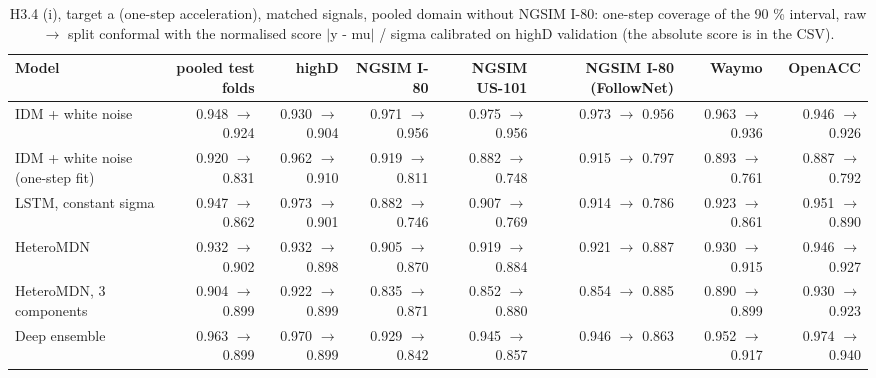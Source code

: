 \begin{table}[htbp]
\centering
\footnotesize
\caption{H3.4 (i), target a (one-step acceleration), matched signals, pooled domain without NGSIM I-80: one-step coverage of the 90 \% interval, raw $\rightarrow$ split conformal with the normalised score $|$y - mu$|$ / sigma calibrated on highD validation (the absolute score is in the CSV).}
\label{tab:t4-onestep-conformal--lodo-ngsim--a}
\begin{tabular}{lrrrrrrr}
\toprule
Model & pooled test folds & highD & NGSIM I-80 & NGSIM US-101 & NGSIM I-80 (FollowNet) & Waymo & OpenACC \\
\midrule
IDM + white noise & 0.948 $\rightarrow$ 0.924 & 0.930 $\rightarrow$ 0.904 & 0.971 $\rightarrow$ 0.956 & 0.975 $\rightarrow$ 0.956 & 0.973 $\rightarrow$ 0.956 & 0.963 $\rightarrow$ 0.936 & 0.946 $\rightarrow$ 0.926 \\
IDM + white noise (one-step fit) & 0.920 $\rightarrow$ 0.831 & 0.962 $\rightarrow$ 0.910 & 0.919 $\rightarrow$ 0.811 & 0.882 $\rightarrow$ 0.748 & 0.915 $\rightarrow$ 0.797 & 0.893 $\rightarrow$ 0.761 & 0.887 $\rightarrow$ 0.792 \\
LSTM, constant sigma & 0.947 $\rightarrow$ 0.862 & 0.973 $\rightarrow$ 0.901 & 0.882 $\rightarrow$ 0.746 & 0.907 $\rightarrow$ 0.769 & 0.914 $\rightarrow$ 0.786 & 0.923 $\rightarrow$ 0.861 & 0.951 $\rightarrow$ 0.890 \\
HeteroMDN & 0.932 $\rightarrow$ 0.902 & 0.932 $\rightarrow$ 0.898 & 0.905 $\rightarrow$ 0.870 & 0.919 $\rightarrow$ 0.884 & 0.921 $\rightarrow$ 0.887 & 0.930 $\rightarrow$ 0.915 & 0.946 $\rightarrow$ 0.927 \\
HeteroMDN, 3 components & 0.904 $\rightarrow$ 0.899 & 0.922 $\rightarrow$ 0.899 & 0.835 $\rightarrow$ 0.871 & 0.852 $\rightarrow$ 0.880 & 0.854 $\rightarrow$ 0.885 & 0.890 $\rightarrow$ 0.899 & 0.930 $\rightarrow$ 0.923 \\
Deep ensemble & 0.963 $\rightarrow$ 0.899 & 0.970 $\rightarrow$ 0.899 & 0.929 $\rightarrow$ 0.842 & 0.945 $\rightarrow$ 0.857 & 0.946 $\rightarrow$ 0.863 & 0.952 $\rightarrow$ 0.917 & 0.974 $\rightarrow$ 0.940 \\

\end{tabular}
\end{table}
